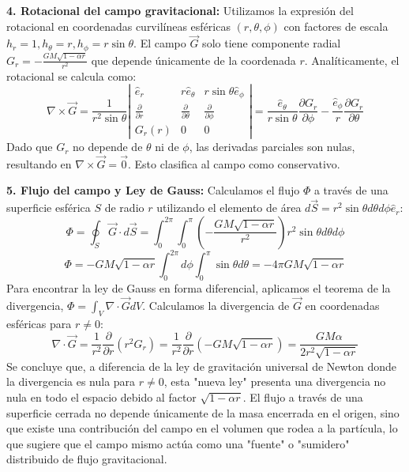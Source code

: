 \documentclass[a4paper]{article}
\begin{document}
\textbf{4. Rotacional del campo gravitacional:}
Utilizamos la expresión del rotacional en coordenadas curvilíneas esféricas $(r, \theta, \phi)$ con factores de escala $h_r = 1, h_\theta = r, h_\phi = r \sin\theta$. El campo $\vec{G}$ solo tiene componente radial $G_r = -\frac{GM\sqrt{1-\alpha r}}{r^2}$ que depende únicamente de la coordenada $r$. Analíticamente, el rotacional se calcula como:
\begin{equation}
\nabla \times \vec{G} = \frac{1}{r^2 \sin \theta} \left| \begin{matrix} \hat{e}_r & r\hat{e}_\theta & r \sin \theta \hat{e}_\phi \\ \frac{\partial}{\partial r} & \frac{\partial}{\partial \theta} & \frac{\partial}{\partial \phi} \\ G_r(r) & 0 & 0 \end{matrix} \right| = \frac{\hat{e}_\theta}{r \sin \theta} \frac{\partial G_r}{\partial \phi} - \frac{\hat{e}_\phi}{r} \frac{\partial G_r}{\partial \theta}
\end{equation}
Dado que $G_r$ no depende de $\theta$ ni de $\phi$, las derivadas parciales son nulas, resultando en $\nabla \times \vec{G} = \vec{0}$. Esto clasifica al campo como conservativo.

\textbf{5. Flujo del campo y Ley de Gauss:}
Calculamos el flujo $\Phi$ a través de una superficie esférica $S$ de radio $r$ utilizando el elemento de área $d\vec{S} = r^2 \sin\theta d\theta d\phi \hat{e}_r$:
\begin{equation}
\Phi = \oint_S \vec{G} \cdot d\vec{S} = \int_0^{2\pi} \int_0^\pi \left( -\frac{GM\sqrt{1-\alpha r}}{r^2} \right) r^2 \sin\theta d\theta d\phi
\end{equation}
\begin{equation}
\Phi = -GM\sqrt{1-\alpha r} \int_0^{2\pi} d\phi \int_0^\pi \sin\theta d\theta = -4\pi GM\sqrt{1-\alpha r}
\end{equation}
Para encontrar la ley de Gauss en forma diferencial, aplicamos el teorema de la divergencia, $\Phi = \int_V \nabla \cdot \vec{G} dV$. Calculamos la divergencia de $\vec{G}$ en coordenadas esféricas para $r \neq 0$:
\begin{equation}
\nabla \cdot \vec{G} = \frac{1}{r^2} \frac{\partial}{\partial r}(r^2 G_r) = \frac{1}{r^2} \frac{\partial}{\partial r}(-GM\sqrt{1-\alpha r}) = \frac{GM\alpha}{2r^2\sqrt{1-\alpha r}}
\end{equation}
Se concluye que, a diferencia de la ley de gravitación universal de Newton donde la divergencia es nula para $r \neq 0$, esta "nueva ley" presenta una divergencia no nula en todo el espacio debido al factor $\sqrt{1-\alpha r}$. El flujo a través de una superficie cerrada no depende únicamente de la masa encerrada en el origen, sino que existe una contribución del campo en el volumen que rodea a la partícula, lo que sugiere que el campo mismo actúa como una "fuente" o "sumidero" distribuido de flujo gravitacional.
\end{document}
